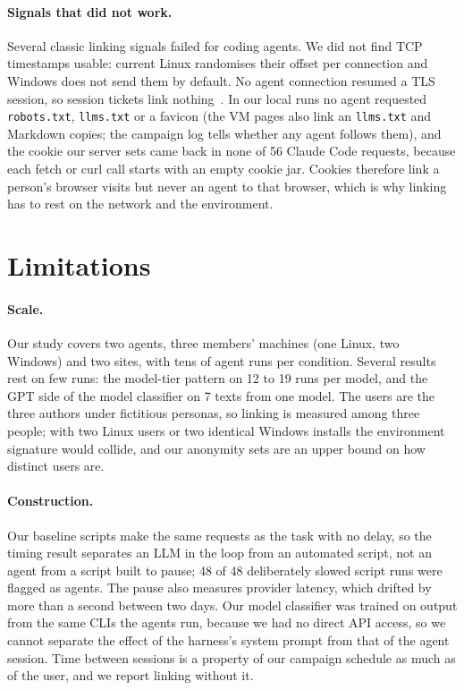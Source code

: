 \paragraph{Signals that did not work.} Several classic linking signals failed for coding agents. We
did not find TCP timestamps usable: current Linux randomises their offset per connection and Windows
does not send them by default. No agent connection resumed a TLS session, so session tickets link
nothing~\cite{sy2018tls}. In our local runs no agent requested \texttt{robots.txt}, \texttt{llms.txt} or a favicon
(the VM pages also link an \texttt{llms.txt} and Markdown copies; the campaign log tells whether any
agent follows them), and the cookie our server sets came back in none of 56 Claude Code requests, because each fetch or curl call
starts with an empty cookie jar. Cookies therefore link a person's browser visits but never an agent to
that browser, which is why linking has to rest on the network and the environment.

\section{Limitations}
\label{sec:limitations}

\paragraph{Scale.} Our study covers two agents, three members' machines (one Linux, two Windows) and two
sites, with tens of agent runs per condition. Several results rest on few runs: the model-tier pattern
on 12 to 19 runs per model, and the GPT side of the model classifier on 7 texts from one model. The
users are the three authors under fictitious personas, so linking is measured among three people; with
two Linux users or two identical Windows installs the environment signature would collide, and our
anonymity sets are an upper bound on how distinct users are.

\paragraph{Construction.} Our baseline scripts make the same requests as the task with no delay, so the
timing result separates an LLM in the loop from an automated script, not an agent from a script built to
pause; 48 of 48 deliberately slowed script runs were flagged as agents. The pause also measures
provider latency, which drifted by more than a second between two days. Our model classifier was trained
on output from the same CLIs the agents run, because we had no direct API access, so we cannot separate
the effect of the harness's system prompt from that of the agent session. Time between sessions is a
property of our campaign schedule as much as of the user, and we report linking without it.

